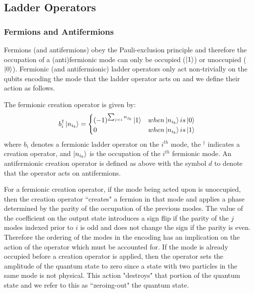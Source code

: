 \subsection{Ladder Operators}
\label{subsec:operators}

\subsubsection{Fermions and Antifermions}

Fermions (and antifermions) obey the Pauli-exclusion principle \cite{pauli1925zusammenhang} and therefore the occupation of a (anti)fermionic mode can only be occupied ($\ket{1}$) or unoccupied ($\ket{0}$).
Fermionic (and antifermionic) ladder operators only act non-trivially on the qubits encoding the mode that the ladder operator acts on and we define their action as follows.

The fermionic creation operator is given by:
\begin{equation}
    b_i^\dagger \ket{n_{i_b}} = 
    \begin{cases} 
        (-1)^{\sum_{j < i} n_{j_b}} \ket{1}  & when \ket{n_{i_b}} is \ket{0} \\
        0 & when \ket{n_{i_b}} is \ket{1}
    \end{cases}
\end{equation}
where $b_i$ denotes a fermionic ladder operator on the $i^{th}$ mode, the $^\dagger$ indicates a creation operator, and $\ket{n_{i_b}}$ is the occupation of the $i^{th}$ fermionic mode.
An antifermionic creation operator is defined as above with the symbol $d$ to denote that the operator acts on antifermions.

For a fermionic creation operator, if the mode being acted upon is unoccupied, then the creation operator ``creates" a fermion in that mode and applies a phase determined by the parity of the occupation of the previous modes.
The value of the coefficient on the output state introduces a sign flip if the parity of the $j$ modes indexed prior to $i$ is odd and does not change the sign if the parity is even. 
Therefore the ordering of the modes in the encoding has an implication on the action of the operator which must be accounted for.
If the mode is already occupied before a creation operator is applied, then the operator sets the amplitude of the quantum state to zero since a state with two particles in the same mode is not physical.
This action "destroys" that portion of the quantum state and we refer to this as ``zeroing-out" the quantum state. 

